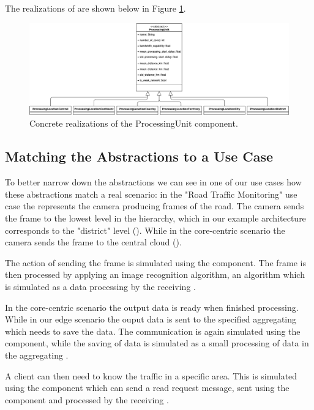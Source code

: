 The realizations of  are shown below in Figure \ref{fig:processing-unit-realizations}.

\begin{figure}[H]
    \centering
    \includegraphics[width=0.99\linewidth]{Figures/Evaluation/processing-unit-realizations.png}
    \caption{Concrete realizations of the ProcessingUnit component.}
    \label{fig:processing-unit-realizations}
\end{figure}


\subsection{Matching the Abstractions to a Use Case}
To better narrow down the abstractions we can see in one of our use cases how these abstractions match a real scenario: in the "Road Traffic Monitoring" use case the  represents the camera producing frames of the road. The camera sends the frame to the lowest level in the hierarchy, which in our example architecture corresponds to the "district" level (). While in the core-centric scenario the camera sends the frame to the central cloud ().

The action of sending the frame is simulated using the  component. The frame is then processed by applying an image recognition algorithm, an algorithm which is simulated as a data processing by the receiving .

In the core-centric scenario the output data is ready when finished processing. While in our edge scenario the ouput data is sent to the specified aggregating  which needs to save the data. The communication is again simulated using the  component, while the saving of data is simulated as a small processing of data in the aggregating .

A client can then need to know the traffic in a specific area. This is simulated using the  component which can send a read request message, sent using the  component and processed by the receiving .


